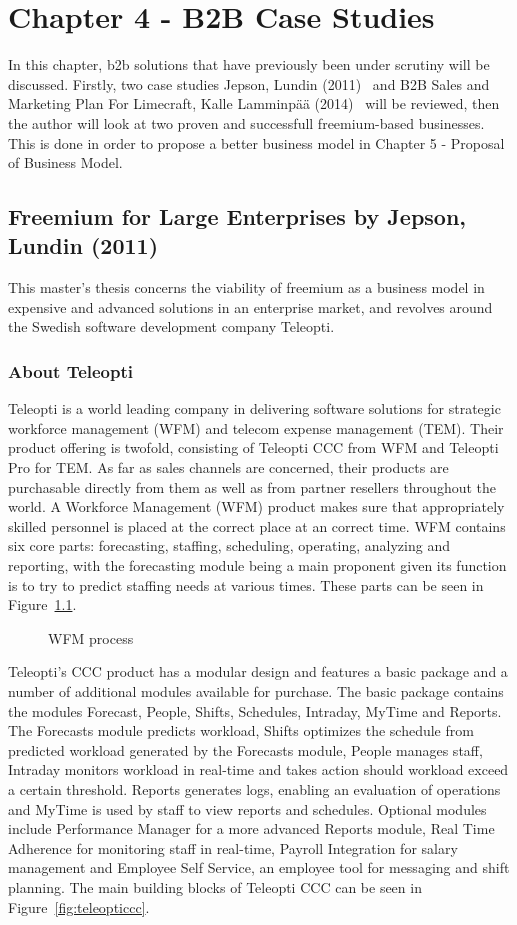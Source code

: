 \chapter{Chapter 4 - B2B Case Studies}
In this chapter, \gls{b2b} solutions that have previously been under scrutiny will be discussed. Firstly, two case studies Jepson, Lundin (2011)~\cite{jepson2009freemium} and B2B Sales and Marketing Plan For Limecraft, Kalle Lamminpää (2014)~\cite{lamminpaa2014b2b} will be reviewed, then the author will look at two proven and successfull freemium-based businesses. This is done in order to propose a better business model in Chapter 5 - Proposal of Business Model.
\section{Freemium for Large Enterprises by Jepson, Lundin (2011)}
This master's thesis concerns the viability of freemium as a business model in expensive and advanced solutions in an enterprise market, and revolves around the Swedish software development company Teleopti.
\subsection{About Teleopti}
Teleopti is a world leading company in delivering software solutions for strategic workforce management (WFM) and telecom expense management (TEM). Their product offering is twofold, consisting of Teleopti CCC from WFM and Teleopti Pro for TEM. As far as sales channels are concerned, their products are purchasable directly from them as well as from partner resellers throughout the world. A Workforce Management (WFM) product makes sure that appropriately skilled personnel is placed at the correct place at an correct time. WFM contains six core parts: forecasting, staffing, scheduling, operating, analyzing and reporting, with the forecasting module being a main proponent given its function is to try to predict staffing needs at various times. These parts can be seen in Figure~\ref{fig:wfm}.

\begin{figure}[H]
    \centering
    \caption{WFM process}
    \label{fig:wfm}
\end{figure}

Teleopti's CCC product has a modular design and features a basic package and a number of additional modules available for purchase. The basic package contains the modules Forecast, People, Shifts, Schedules, Intraday, MyTime and Reports. The Forecasts module predicts workload, Shifts optimizes the schedule from predicted workload generated by the Forecasts module, People manages staff, Intraday monitors workload in real-time and takes action should workload exceed a certain threshold. Reports generates logs, enabling an evaluation of operations and MyTime is used by staff to view reports and schedules. Optional modules include Performance Manager for a more advanced Reports module, Real Time Adherence for monitoring staff in real-time, Payroll Integration for salary management and Employee Self Service, an employee tool for messaging and shift planning. The main building blocks of Teleopti CCC can be seen in Figure~\ref{fig:teleopticcc}.

